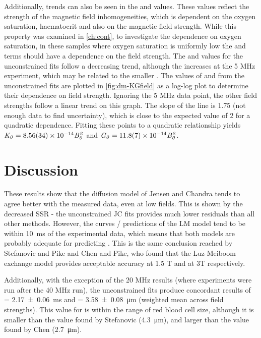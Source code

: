Additionally, trends can also be seen in the \Kzero and \Gzero values.
These values reflect the strength of the magnetic field inhomogeneities, which is dependent on the oxygen saturation, haematocrit and also on the magnetic field strength.
While this property was examined in \autoref{ch:cont}, to investigate the dependence on oxygen saturation, in these samples where oxygen saturation is uniformly low the \Kzero and \Gzero terms should have a dependence on the field strength.
The \Kzero and \Gzero values for the unconstrained fits follow a decreasing trend, although the \Gzero increases at the 5 MHz experiment, which may be related to the smaller \rc.
The values of \Kzero and \Gzero from the unconstrained fits are plotted in \autoref{fig:dm-KGfield} as a log-log plot to determine their dependence on field strength.
Ignoring the 5 MHz data point, the other field strengths follow a linear trend on this graph.
The slope of the line is \num{1.75} (not enough data to find uncertainty), which is close to the expected value of 2 for a quadratic dependence.
Fitting these points to a quadratic relationship yields $\mathit{K_0=\num{8.56\pm0.34e-14}B_0^2}$ and $\mathit{G_0 = \num{11.8\pm0.7e-14}B_0^2}$.

\section{Discussion}
These results show that the diffusion model of Jensen and Chandra tends to agree better with the measured data, even at low fields.
This is shown by the decreased SSR - the unconstrained JC fits provides much lower residuals than all other methods.
However, the curves / predictions of the LM model tend to be within \SI{10}{ms} of the experimental data, which means that both models are probably adequate for predicting \Ttwo.
This is the same conclusion reached by Stefanovic and Pike and Chen and Pike, who found that the Luz-Meiboom exchange model provides acceptable accuracy at 1.5 T and at 3T respectively.

Additionally, with the exception of the 20 MHz results (where experiments were run after the 40 MHz run), the unconstrained fits produce concordant results of \Texc = \SI{2.17\pm0.06}{ms} and \rc = \SI{3.58 \pm 0.08}{\micro\metre} (weighted mean across field strengths).
This value for \rc is within the range of red blood cell size, although it is smaller than the value found by Stefanovic (\SI{4.3}{\micro\metre})\cite{StefanovicHumanwholebloodrelaxometry2004}, and larger than the value found by Chen (\SI{2.7}{\micro\metre})\cite{ChenHumanwholeblood2009}.


